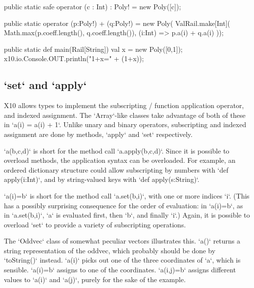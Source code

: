 \begin{xten}
  public static safe operator (c : Int) : Poly! = new Poly([c]);

  public static operator (p:Poly!) + (q:Poly!) = new Poly(
      ValRail.make[Int](
        Math.max(p.coeff.length(), q.coeff.length()),
        (i:Int) => p.a(i) + q.a(i)
     ));

  public static def main(Rail[String]) {
     val x = new Poly([0,1]);
     x10.io.Console.OUT.println("1+x=" + (1+x));
  }
\end{xten}


\subsection{\xcd`set` and \xcd`apply`}

X10 allows types to implement the subscripting / function application
operator, and indexed assignment.  The \xcd`Array`-like classes take advantage
of both of these in \xcd`a(i) = a(i) + 1`.  Unlike unary and binary operators,
subscripting and indexed assignment are done by methods, \xcd`apply` and
\xcd`set` respectively.

\xcd`a(b,c,d)` is short for the method call \xcd`a.apply(b,c,d)`.  Since it is
possible to overload methods, the application syntax can be overloaded.  For
example, an ordered dictionary structure could allow subscripting by numbers
with \xcd`def apply(i:Int)`, and by string-valued keys with 
\xcd`def apply(s:String)`.  

\xcd`a(i)=b` is short for the method call \xcd`a.set(b,i)`, with one or more
indices \xcd`i`. (This has a
possibly surprising consequence for the order of evaluation: in \xcd`a(i)=b`,
as in \xcd`a.set(b,i)`, \xcd`a` is evaluated first, then \xcd`b`, and finally
\xcd`i`.)  Again, it is possible to overload \xcd`set` to provide a variety of
subscripting operations.

The \xcd`Oddvec` class of somewhat peculiar vectors illustrates this.
\xcd`a()` returns a string representation of the oddvec, which probably should
be done by \xcd`toString()` instead.  \xcd`a(i)` picks out one of the three
coordinates of \xcd`a`, which is sensible.  \xcd`a(i)=b` assigns to one of the
coordinates.  \xcd`a(i,j)=b` assigns different values to \xcd`a(i)` and
\xcd`a(j)`, purely for the sake of the example.

